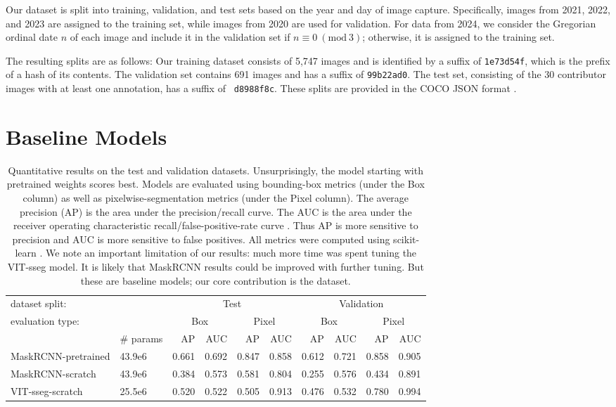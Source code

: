 \documentclass[10pt,twocolumn,letterpaper]{article}
\begin{document}
Our dataset is split into training, validation, and test sets based on the year and day of image capture.
Specifically, images from 2021, 2022, and 2023 are assigned to the training set, while images from 2020 are
  used for validation.
For data from 2024, we consider the Gregorian ordinal date $n$ of each image and include it in the validation set if
$n \equiv 0 \ (\textrm{mod}\ 3)$; otherwise, it is assigned to the training set.

The resulting splits are as follows:
Our training dataset consists of 5,747 images and is identified by a suffix of {\tt 1e73d54f}, which is the
  prefix of a hash of its contents.
The validation set contains 691 images and has a suffix of {\tt 99b22ad0}.
The test set, consisting of the 30 contributor images with at least one annotation, has a suffix of {\tt
  d8988f8c}.
These splits are provided in the COCO JSON format \cite{lin_microsoft_2014}.


\section{Baseline Models}
\label{sec:models}

\begin{table*}[t]
\centering
\begin{tabular}{ll|rrrr|rrrr}
\toprule
dataset split: & {} & \multicolumn{4}{c}{Test} & \multicolumn{4}{c}{Validation} \\
evaluation type: & {} & \multicolumn{2}{c}{Box} & \multicolumn{2}{c}{Pixel} & \multicolumn{2}{c}{Box} & \multicolumn{2}{c}{Pixel} \\
{} &  \# params & AP & AUC & AP & AUC & AP & AUC & AP & AUC \\
\midrule
MaskRCNN-pretrained &  43.9e6 &  0.661 &   0.692 &    0.847 &     0.858 &  0.612 &   0.721 &    0.858 &     0.905 \\
MaskRCNN-scratch    &  43.9e6 &  0.384 &   0.573 &    0.581 &     0.804 &  0.255 &   0.576 &    0.434 &     0.891 \\
VIT-sseg-scratch    &  25.5e6 &  0.520 &   0.522 &    0.505 &     0.913 &  0.476 &   0.532 &    0.780 &     0.994 \\
\bottomrule
\end{tabular}
\caption[]{
    Quantitative results on the test and validation datasets. 
    Unsurprisingly, the model starting with pretrained weights scores best.
    Models are evaluated using bounding-box metrics (under the Box column) as
    well as pixelwise-segmentation metrics (under the Pixel column). The
    average precision (AP) is the area under the precision/recall curve. The
    AUC is the area under the receiver operating characteristic
    recall/false-positive-rate curve .
    Thus AP is more sensitive to precision
    and AUC is more sensitive to false positives.
    All metrics were computed using scikit-learn \cite{scikit-learn}.
    We note an important limitation of our results: much more time was spent
    tuning the VIT-sseg model. It is likely that MaskRCNN results could be
    improved with further tuning. But these are baseline models; our core contribution is the dataset.
}
\label{tab:model_results}
\end{table*}
\end{document}
